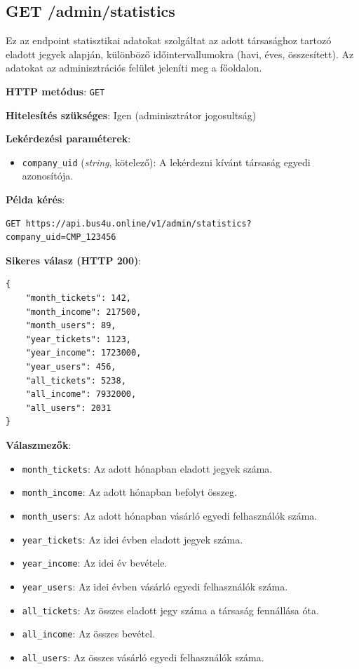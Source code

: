 \subsection{GET /admin/statistics}
Ez az endpoint statisztikai adatokat szolgáltat az adott társasághoz tartozó eladott jegyek alapján, különböző időintervallumokra (havi, éves, összesített). Az adatokat az adminisztrációs felület jeleníti meg a főoldalon.

\textbf{HTTP metódus}: \verb|GET|

\textbf{Hitelesítés szükséges}: Igen (adminisztrátor jogosultság)

\textbf{Lekérdezési paraméterek}:
\begin{itemize}
    \item \texttt{company\_uid} (\textit{string}, kötelező): A lekérdezni kívánt társaság egyedi azonosítója.
\end{itemize}

\textbf{Példa kérés}:
\begin{verbatim}
GET https://api.bus4u.online/v1/admin/statistics?company_uid=CMP_123456
\end{verbatim}

\textbf{Sikeres válasz (HTTP 200)}:
\begin{verbatim}
{
    "month_tickets": 142,
    "month_income": 217500,
    "month_users": 89,
    "year_tickets": 1123,
    "year_income": 1723000,
    "year_users": 456,
    "all_tickets": 5238,
    "all_income": 7932000,
    "all_users": 2031
}
\end{verbatim}

\textbf{Válaszmezők}:
\begin{itemize}
    \item \texttt{month\_tickets}: Az adott hónapban eladott jegyek száma.
    \item \texttt{month\_income}: Az adott hónapban befolyt összeg.
    \item \texttt{month\_users}: Az adott hónapban vásárló egyedi felhasználók száma.
    \item \texttt{year\_tickets}: Az idei évben eladott jegyek száma.
    \item \texttt{year\_income}: Az idei év bevétele.
    \item \texttt{year\_users}: Az idei évben vásárló egyedi felhasználók száma.
    \item \texttt{all\_tickets}: Az összes eladott jegy száma a társaság fennállása óta.
    \item \texttt{all\_income}: Az összes bevétel.
    \item \texttt{all\_users}: Az összes vásárló egyedi felhasználók száma.
\end{itemize}

